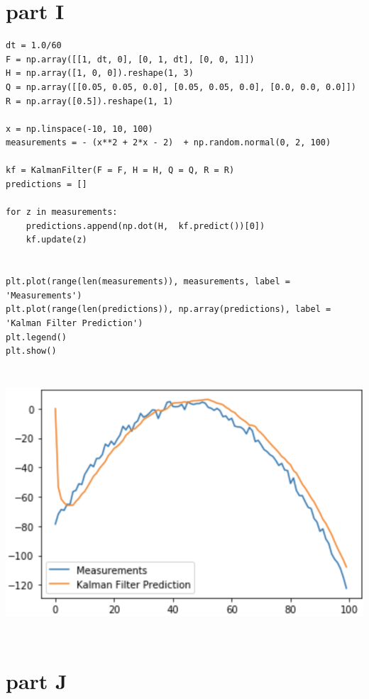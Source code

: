\documentclass[a4paper,11pt]{article}
\makeatletter
\newcommand{\problemquestion}[1]{\gdef\@problemquestion{#1}}%
\theoremstyle{mytheor}
\makeatother
\begin{document}
\section*{part I}
\begin{problem}
  \problemquestion{generate some data and show that your implementation of KF is correct}
\end{problem}

\begin{lstlisting}
dt = 1.0/60
F = np.array([[1, dt, 0], [0, 1, dt], [0, 0, 1]])
H = np.array([1, 0, 0]).reshape(1, 3)
Q = np.array([[0.05, 0.05, 0.0], [0.05, 0.05, 0.0], [0.0, 0.0, 0.0]])
R = np.array([0.5]).reshape(1, 1)

x = np.linspace(-10, 10, 100)
measurements = - (x**2 + 2*x - 2)  + np.random.normal(0, 2, 100)

kf = KalmanFilter(F = F, H = H, Q = Q, R = R)
predictions = []

for z in measurements:
    predictions.append(np.dot(H,  kf.predict())[0])
    kf.update(z)


plt.plot(range(len(measurements)), measurements, label = 'Measurements')
plt.plot(range(len(predictions)), np.array(predictions), label = 'Kalman Filter Prediction')
plt.legend()
plt.show()
\end{lstlisting}{}

\includegraphics[width=15cm, height=10cm]{I.png}

\section*{part J}
\begin{problem}
  \problemquestion{using KF function implement LQG controller}
\end{problem}
\end{document}

